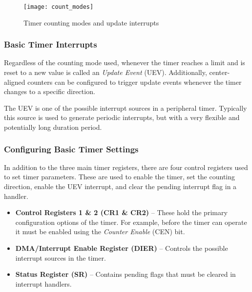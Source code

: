 \documentclass[11pt,fleqn]{book} %
\begin{document}
    \begin{figure}[]
        \centering\texttt{[image: count\_modes]}
        \caption{Timer counting modes and update interrupts}
        \label{count_modes}
    \end{figure}
    
    \subsubsection{Basic Timer Interrupts}
    
    Regardless of the counting mode used, whenever the timer reaches a limit and is reset to a new value is called an \textit{Update Event} (UEV). Additionally, center-aligned counters can be configured to trigger update events whenever the timer changes to a specific direction. 
    
    The UEV is one of the possible interrupt sources in a peripheral timer. Typically this source is used to generate periodic interrupts, but with a very flexible and potentially long duration period.
    
    
    \subsubsection{Configuring Basic Timer Settings}
    In addition to the three main timer registers, there are four control registers used to set timer parameters. These are used to enable the timer, set the counting direction, enable the UEV interrupt, and clear the pending interrupt flag in a handler. 
    
    \begin{itemize}
        \item \textbf{Control Registers 1 \& 2 (CR1 \& CR2)} -- These hold the primary configuration options of the timer. For example, before the timer can operate it must be enabled using the \textit{Counter Enable} (CEN) bit. 
        \item\textbf{DMA/Interrupt Enable Register (DIER)} -- Controls the possible interrupt sources in the timer.
        \item\textbf{Status Register (SR)} -- Contains pending flags that must be cleared in interrupt handlers.
    \end{itemize}
\end{document}
